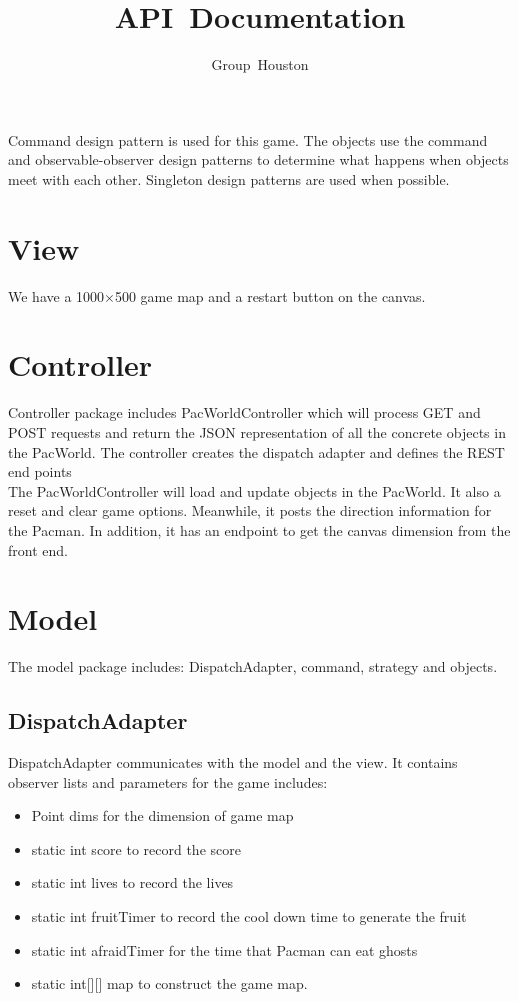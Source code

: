 \documentclass[letterpaper, 11pt]{article}
\author{Group~Houston}
\title{API~Documentation}
\date{}
\begin{document}
\maketitle
Command design pattern is used for this game. The objects use the command and observable-observer design patterns to determine what happens when objects meet with each other. Singleton design patterns are used when possible. 
\section{View}
We have a 1000$\times$500 game map and a restart button on the canvas.
\section{Controller}
Controller package includes PacWorldController which will process GET and POST requests and return the JSON representation of all the concrete objects in the PacWorld. The controller creates the dispatch adapter and defines the REST end points\\ 
 
The PacWorldController will load and update objects in the PacWorld. It also a reset and clear game options. Meanwhile, it posts the direction information for the Pacman. In addition, it has an endpoint to get the canvas dimension from the front end.
\section{Model}
The model  package includes: DispatchAdapter, command, strategy and objects.

\subsection{DispatchAdapter}
DispatchAdapter communicates with the model and the view. It contains observer lists and parameters for the game includes:
\begin{itemize}
\item Point dims for the dimension of game map
\item static int score to record the score
\item static int lives to record the lives
\item static int fruitTimer to record the cool down time to generate the fruit
\item static int afraidTimer for the time that Pacman can eat ghosts 
\item static int[][] map to construct the game map.
\end{itemize}
\end{document}

